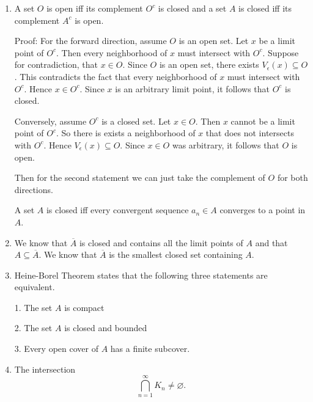 \documentclass[12pt]{article}
\begin{document}
\begin{enumerate}[label=(\alph*)]
          A set \( A \) is nowhere dense iff \(\overline{A}\) has no nonempty open intervals.

          A set \( A \) is \( F_\sigma \) iff it can be written as the infinite union of closed sets.

          A set \( A \) is \( G_\delta \) iff it can be written as the infinite intersection of open sets.

    \item A set \( O\) is open iff its complement \( O^c \) is closed and a set \( A \) is closed iff its complement \( A^c\) is open.

          Proof:
          For the forward direction, assume \( O \) is an open set. Let \( x \) be a limit point of \( O^c \). Then every neighborhood of \(x\) must intersect with \(O^c\).
          Suppose for contradiction, that \(x \in O\). Since \( O\) is an open set, there exists \(V_\epsilon(x) \subseteq O\). This contradicts the fact that every neighborhood of \(x\) must intersect with \(O^c\). Hence \(x \in O^c\). Since \(x\) is an arbitrary limit point, it follows that \( O^c \) is closed.

          Conversely, assume \( O^c \) is a closed set. Let \(x \in O\). Then \(x\) cannot be a limit point of \(O^c\). So there is exists a neighborhood of \(x\) that does not intersects with \(O^c\). Hence \( V_\epsilon(x) \subseteq O \). Since \( x \in O\) was arbitrary, it follows that \( O \) is open.

          Then for the second statement we can just take the complement of \( O \) for both directions.

          A set \(A\) is closed iff every convergent sequence \( a_n \in A \) converges to a point in \( A \).

    \item We know that \( \overline{A} \) is closed and contains all the limit points of \(A\) and that \( A \subseteq \overline{A} \). We know that \( \overline{A} \) is the smallest closed set containing \(A\).

    \item Heine-Borel Theorem states that the following three statements are equivalent.

          1. The set \( A \) is compact

          2. The set \( A \) is closed and bounded

          3. Every open cover of \( A \) has a finite subcover.

    \item The intersection
          \[
              \bigcap_{n=1}^{\infty} K_n \neq \varnothing.
          \]


\end{enumerate}
\end{document}
